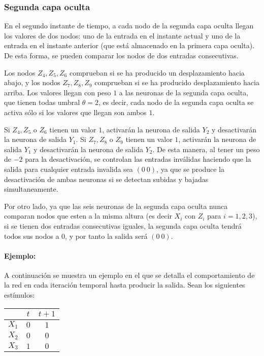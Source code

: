 \documentclass[spanish]{assignment}
\begin{document}
	\subsubsection{Segunda capa oculta}
	En el segundo instante de tiempo, a cada nodo de la segunda capa oculta llegan los valores de dos nodos: uno de la entrada en el instante actual y uno de la entrada en el instante anterior (que está almacenado en la primera capa oculta). De esta forma, se pueden comparar los nodos de dos entradas consecutivas.
	
	Los nodos $Z_4, Z_5, Z_6$ comprueban si se ha producido un desplazamiento hacia abajo, y los nodos $Z_7, Z_8, Z_9$ comprueban si se ha producido desplazamiento hacia arriba.	Los valores llegan con peso $1$ a las neuronas de la segunda capa oculta, que tienen todas umbral $\theta=2$, es decir, cada nodo de la segunda capa oculta se activa sólo si los valores que llegan son ambos $1$.
	
	Si $Z_4, Z_5$ o $Z_6$ tienen un valor $1$, activarán la neurona de salida $Y_2$ y desactivarán la neurona de salida $Y_1$. Si $Z_7, Z_8$ o $Z_9$ tienen un valor $1$, activarán la neurona de salida $Y_1$ y desactivarán la neurona de salida $Y_2$. De esta manera, al tener un peso de $-2$ para la desactivación, se controlan las entradas inválidas haciendo que la salida para cualquier entrada invalida sea $(0\ 0)$, ya que se produce la desactivación de ambas neuronas si se detectan subidas y bajadas simultaneamente.
	
	Por otro lado, ya que las seis neuronas de la segunda capa oculta nunca comparan nodos que esten a la misma altura (es decir $X_i$ con $Z_i$ para $i=1,2,3$), si se tienen dos entradas consecutivas iguales, la segunda capa oculta tendrá todos sus nodos a $0$, y por tanto la salida será $(0\ 0)$.

	\newpage
	\paragraph{Ejemplo:}
	A continuación se muestra un ejemplo en el que se detalla el comportamiento de la red en cada iteración temporal hasta producir la salida. Sean los siguientes estímulos:
	\begin{center}
		\begin{tabular}{c|c|c|}
			& $t$ & $t+1$ \\
			\hline
			$X_1$ & $0$ & $1$   \\
			$X_2$ & $0$ & $0$   \\
			$X_3$ & $1$ & $0$  
		\end{tabular}
	\end{center}
	
\end{document}
